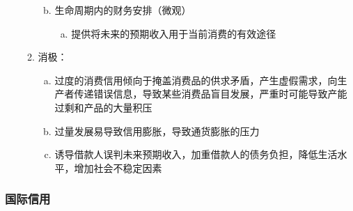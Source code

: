 \documentclass[12pt]{book}
\begin{document}
\begin{enumerate}[1.]
\begin{enumerate}[(1)]
\begin{enumerate}[a.]
\begin{enumerate}[(a)]
                              \end{enumerate}
                        \item 生命周期内的财务安排（微观）
                              \begin{enumerate}[(a)]
                                  \item 提供将未来的预期收入用于当前消费的有效途径
                              \end{enumerate}
                    \end{enumerate}
              \item 消极：
                    \begin{enumerate}[a.]
                        \item 过度的消费信用倾向于掩盖消费品的供求矛盾，产生虚假需求，向生产者传递错误信息，导致某些消费品盲目发展，严重时可能导致产能过剩和产品的大量积压
                        \item 过量发展易导致信用膨胀，导致通货膨胀的压力
                        \item 诱导借款人误判未来预期收入，加重借款人的债务负担，降低生活水平，增加社会不稳定因素
                    \end{enumerate}
          \end{enumerate}
\end{enumerate}



\subsubsection{国际信用}
\end{document}
